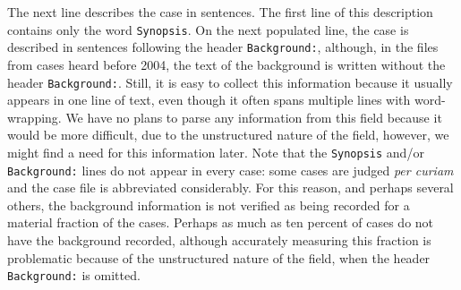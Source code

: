 \documentclass[11pt]{paper}
\begin{document}
The next line describes the case in sentences. 
The first line of this description contains only the word \texttt{Synopsis}. 
On the next populated line, the case is described in sentences following the header \texttt{Background:}, 
although, in the files from cases heard before 2004, the text of the background is written without the 
header \texttt{Background:}. 
Still, it is easy to collect this information because it usually appears in one line of text, 
even though it often spans multiple lines with word-wrapping.
We have no plans to parse any information from this field because it would be more difficult, 
due to the unstructured nature of the field, 
however, we might find a need for this information later. 
Note that the \texttt{Synopsis} and/or \texttt{Background:} lines do not appear in every case:
some cases are judged \emph{per curiam} and the case file is abbreviated considerably. 
For this reason, and perhaps several others, 
the background information is not verified as being recorded for a material fraction of the cases. 
Perhaps as much as ten percent of cases do not have the background recorded, 
although accurately measuring this fraction is problematic because of the unstructured nature
of the field, when the header \texttt{Background:} is omitted. 
\end{document}
